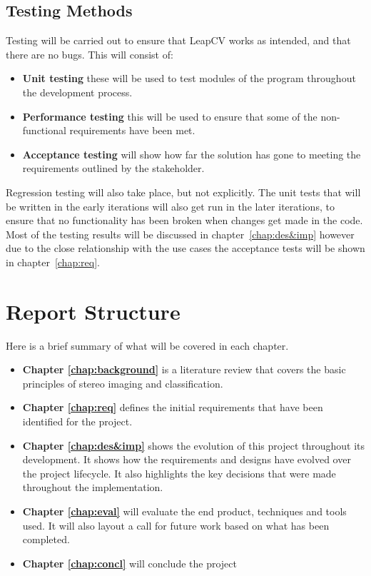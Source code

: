 \documentclass[11pt,oneside]{report}
\begin{document}
			\subsection{Testing Methods}
				Testing will be carried out to ensure that LeapCV works as intended, and that there are no bugs.
				This will consist of:
				\begin{itemize}
					\item \textbf{Unit testing} these will be used to test modules of the program throughout the development process.
					\item \textbf{Performance testing} this will be used to ensure that some of the non-functional requirements have been met.
					\item \textbf{Acceptance testing} will show how far the solution has gone to meeting the requirements outlined by the stakeholder.
				\end{itemize}
				Regression testing will also take place, but not explicitly.
				The unit tests that will be written in the early iterations will also get run in the later iterations, to ensure that no functionality has been broken when changes get made in the code.
				Most of the testing results will be discussed in chapter~\ref{chap:des&imp} however due to the close relationship with the use cases the acceptance tests will be shown in chapter~\ref{chap:req}.
				
		\section{Report Structure}
			Here is a brief summary of what will be covered in each chapter.
			\begin{itemize}
			 \item \textbf{Chapter \ref{chap:background}}
			 	is a literature review that covers the basic principles of stereo imaging and classification.
			 \item \textbf{Chapter \ref{chap:req}}
			 	defines the initial requirements that have been identified for the project.
			 \item \textbf{Chapter \ref{chap:des&imp}}
			 	shows the evolution of this project throughout its development.
			 	It shows how the requirements and designs have evolved over the project lifecycle.
			 	It also highlights the key decisions that were made throughout the implementation.
			 	
			 \item \textbf{Chapter \ref{chap:eval}}
			 	will evaluate the end product, techniques and tools used. It will also layout a call for future work based on what has been completed.
			 \item \textbf{Chapter \ref{chap:concl}} will conclude the project
			\end{itemize}
						
\end{document}
